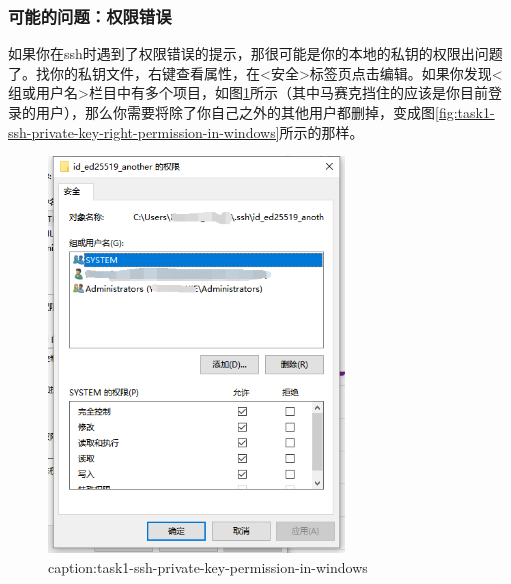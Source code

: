 \subsubsection{可能的问题：权限错误}

如果你在ssh时遇到了权限错误的提示，那很可能是你的本地的私钥的权限出问题了。找你的私钥文件，右键查看属性，在<安全>标签页点击编辑。如果你发现<组或用户名>栏目中有多个项目，如图\ref{fig:task1-ssh-private-key-permission-in-windows}所示（其中马赛克挡住的应该是你目前登录的用户），那么你需要将除了你自己之外的其他用户都删掉，变成图\ref{fig:task1-ssh-private-key-right-permission-in-windows}所示的那样。

\begin{figure}[htbp]
	\centering
	\includegraphics[width=0.7\textwidth]{figures/task1-ssh-private-key-permission-in-windows.png}
	\caption{caption:task1-ssh-private-key-permission-in-windows}
	\label{fig:task1-ssh-private-key-permission-in-windows}
\end{figure}


